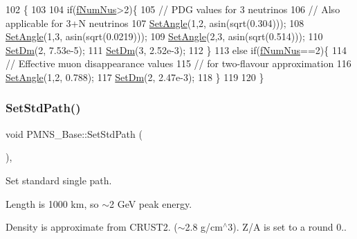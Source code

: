\begin{DoxyCode}
102 \{
103 
104   \textcolor{keywordflow}{if}(\hyperlink{classOscProb_1_1PMNS__Base_a24bb74bed63569dfe88b18fa6a08060e}{fNumNus}>2)\{
105     \textcolor{comment}{// PDG values for 3 neutrinos}
106     \textcolor{comment}{// Also applicable for 3+N neutrinos}
107     \hyperlink{classOscProb_1_1PMNS__Base_ace7875cf6d3bec161a2b7ed2690aec34}{SetAngle}(1,2, asin(sqrt(0.304)));
108     \hyperlink{classOscProb_1_1PMNS__Base_ace7875cf6d3bec161a2b7ed2690aec34}{SetAngle}(1,3, asin(sqrt(0.0219)));
109     \hyperlink{classOscProb_1_1PMNS__Base_ace7875cf6d3bec161a2b7ed2690aec34}{SetAngle}(2,3, asin(sqrt(0.514)));
110     \hyperlink{classOscProb_1_1PMNS__Base_a492243b22fb1b783cd2943f507cff970}{SetDm}(2, 7.53e-5);
111     \hyperlink{classOscProb_1_1PMNS__Base_a492243b22fb1b783cd2943f507cff970}{SetDm}(3, 2.52e-3);
112   \}
113   \textcolor{keywordflow}{else} \textcolor{keywordflow}{if}(\hyperlink{classOscProb_1_1PMNS__Base_a24bb74bed63569dfe88b18fa6a08060e}{fNumNus}==2)\{
114     \textcolor{comment}{// Effective muon disappearance values}
115     \textcolor{comment}{// for two-flavour approximation}
116     \hyperlink{classOscProb_1_1PMNS__Base_ace7875cf6d3bec161a2b7ed2690aec34}{SetAngle}(1,2, 0.788);
117     \hyperlink{classOscProb_1_1PMNS__Base_a492243b22fb1b783cd2943f507cff970}{SetDm}(2, 2.47e-3);
118   \}
119 
120 \}
\end{DoxyCode}
\mbox{\label{classOscProb_1_1PMNS__Base_add6533a9fc9acdfc7ae258b62570d78d}} 
\subsubsection{\texorpdfstring{Set\+Std\+Path()}{SetStdPath()}}
{\footnotesize\ttfamily void P\+M\+N\+S\+\_\+\+Base\+::\+Set\+Std\+Path (\begin{DoxyParamCaption}{ }\end{DoxyParamCaption})\hspace{0.3cm}{\ttfamily [virtual]}, {\ttfamily [inherited]}}

Set standard single path.

Length is 1000 km, so $\sim$2 GeV peak energy.

Density is approximate from C\+R\+U\+S\+T2. ($\sim$2.8 g/cm$^\wedge$3). Z/A is set to a round 0.. 

